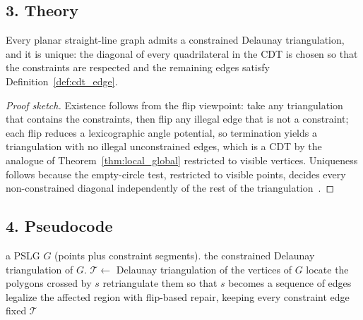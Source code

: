 \subsection{3. Theory}

\begin{theorem}\label{thm:cdt}
Every planar straight-line graph admits a constrained Delaunay triangulation,
and it is unique: the diagonal of every quadrilateral in the CDT is chosen so
that the constraints are respected and the remaining edges satisfy
Definition~\ref{def:cdt_edge}.
\end{theorem}

\begin{proof}[Proof sketch]
Existence follows from the flip viewpoint: take any triangulation that contains
the constraints, then flip any illegal edge that is not a constraint; each flip
reduces a lexicographic angle potential, so termination yields a triangulation
with no illegal unconstrained edges, which is a CDT by the analogue of
Theorem~\ref{thm:local_global} restricted to visible vertices. Uniqueness
follows because the empty-circle test, restricted to visible points, decides
every non-constrained diagonal independently of the rest of the
triangulation~\cite{chew1989,deberg2008}.
\end{proof}

\subsection{4. Pseudocode}

\begin{algorithm}[htbp]
\caption{CDT by Constraint Recovery}
\label{alg:cdt_recovery}
\begin{algorithmic}[1]
\Require a PSLG $G$ (points plus constraint segments).
\Ensure the constrained Delaunay triangulation of $G$.
  \State $\mathcal{T} \gets $ Delaunay triangulation of the vertices of $G$
      \State locate the polygons crossed by $s$
      \State retriangulate them so that $s$ becomes a sequence of edges
      \State legalize the affected region with flip-based repair, keeping
             every constraint edge fixed
    \EndIf
  \EndFor
  \State \Return $\mathcal{T}$
\EndFunction
\end{algorithmic}
\end{algorithm}

